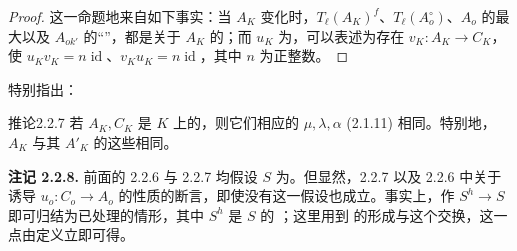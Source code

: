 \begin{proof}
这一命题地来自如下事实：当 $A_K$ 变化时，$T_\ell(A_K)^f$、$T_\ell(A_o^\circ)$、$A_o$ 的最大以及 $A_{ok'}$ 的“”，都是关于 $A_K$ 的；而 $u_K$ 为，可以表述为存在 $v_K:A_K\to C_K$，使 $u_Kv_K=n\operatorname{id}$、$v_Ku_K=n\operatorname{id}$，其中 $n$ 为正整数。
\end{proof}
特别指出：
\begin{SGAresult}{推论}{2.2.7}
若 $A_K,C_K$ 是 $K$ 上的，则它们相应的 $\mu,\lambda,\alpha$ (2.1.11) 相同。特别地，$A_K$ 与其 $A'_K$ 的这些相同。
\end{SGAresult}
\textbf{注记 2.2.8.} 前面的 2.2.6 与 2.2.7 均假设 $S$ 为。但显然，2.2.7 以及 2.2.6 中关于诱导 $u_o:C_o\to A_o$ 的性质的断言，即使没有这一假设也成立。事实上，作 $S^h\to S$ 即可归结为已处理的情形，其中 $S^h$ 是 $S$ 的 ；这里用到 的形成与这个交换，这一点由定义立即可得。
